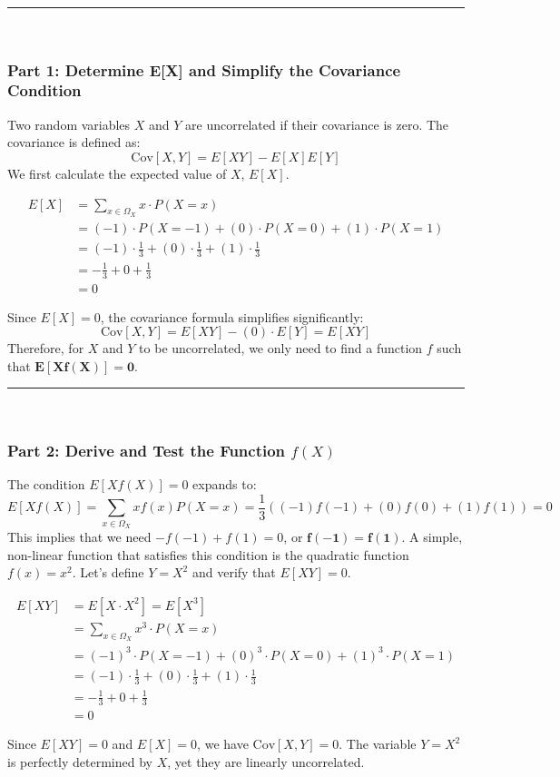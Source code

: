 \documentclass{article}
\begin{document}
\vspace{1em}
\noindent\rule{\textwidth}{0.4pt}\\

\subsubsection*{Part 1: Determine E[X] and Simplify the Covariance Condition}
\parbox{\textwidth}{
    Two random variables $X$ and $Y$ are uncorrelated if their covariance is zero. The covariance is defined as:
    $$ \text{Cov}[X, Y] = E[XY] - E[X]E[Y] $$
    We first calculate the expected value of $X$, $E[X]$.
}
\begin{align*}
    E[X] &= \sum_{x \in \Omega_X} x \cdot P(X=x) \\
         &= (-1) \cdot P(X=-1) + (0) \cdot P(X=0) + (1) \cdot P(X=1) \\
         &= (-1) \cdot \frac{1}{3} + (0) \cdot \frac{1}{3} + (1) \cdot \frac{1}{3} \\
         &= -\frac{1}{3} + 0 + \frac{1}{3} \\
         &= 0
\end{align*}
\parbox{\textwidth}{
    Since $E[X] = 0$, the covariance formula simplifies significantly:
    $$ \text{Cov}[X, Y] = E[XY] - (0) \cdot E[Y] = E[XY] $$
    Therefore, for $X$ and $Y$ to be uncorrelated, we only need to find a function $f$ such that $\mathbf{E[X f(X)] = 0}$.
}

\vspace{1em}
\noindent\rule{\textwidth}{0.4pt}\\

\subsubsection*{Part 2: Derive and Test the Function $f(X)$}
\parbox{\textwidth}{
    The condition $E[X f(X)] = 0$ expands to:
    $$ E[X f(X)] = \sum_{x \in \Omega_X} x f(x) P(X=x) = \frac{1}{3} \left( (-1)f(-1) + (0)f(0) + (1)f(1) \right) = 0 $$
    This implies that we need $-f(-1) + f(1) = 0$, or $\mathbf{f(-1) = f(1)}$. A simple, non-linear function that satisfies this condition is the quadratic function $f(x) = x^2$. Let's define $Y = X^2$ and verify that $E[XY] = 0$.
}
\begin{align*}
    E[XY] &= E[X \cdot X^2] = E[X^3] \\
          &= \sum_{x \in \Omega_X} x^3 \cdot P(X=x) \\
          &= (-1)^3 \cdot P(X=-1) + (0)^3 \cdot P(X=0) + (1)^3 \cdot P(X=1) \\
          &= (-1) \cdot \frac{1}{3} + (0) \cdot \frac{1}{3} + (1) \cdot \frac{1}{3} \\
          &= -\frac{1}{3} + 0 + \frac{1}{3} \\
          &= 0
\end{align*}
\parbox{\textwidth}{
    Since $E[XY] = 0$ and $E[X]=0$, we have $\text{Cov}[X, Y] = 0$. The variable $Y=X^2$ is perfectly determined by $X$, yet they are linearly uncorrelated.
}
\end{document}
